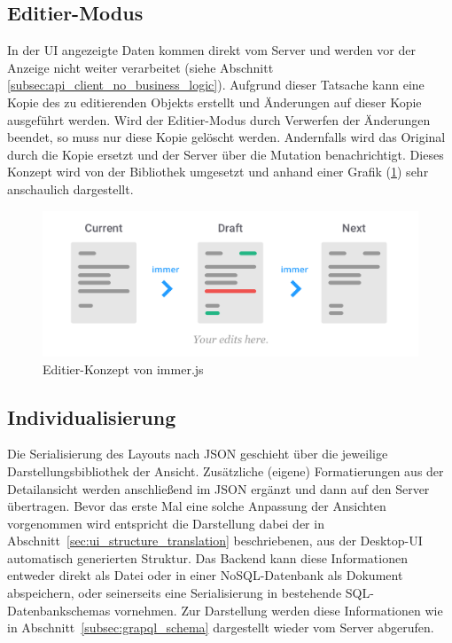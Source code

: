 \subsection{Editier-Modus}
In der UI angezeigte Daten kommen direkt vom Server und werden vor der Anzeige nicht weiter verarbeitet (siehe Abschnitt \ref{subsec:api_client_no_business_logic}). Aufgrund dieser Tatsache kann eine Kopie des zu editierenden Objekts erstellt und Änderungen auf dieser Kopie ausgeführt werden. Wird der Editier-Modus durch Verwerfen der Änderungen beendet, so muss nur diese Kopie gelöscht werden. Andernfalls wird das Original durch die Kopie ersetzt und der Server über die Mutation benachrichtigt. Dieses Konzept wird von der Bibliothek  \parencite{weststrate_2019} umgesetzt und anhand einer Grafik (\ref{fig:immer_draft_concept}) sehr anschaulich dargestellt.

\begin{figure}
    \centering
    \captionsetup{justification=centering}
    \includegraphics[width=\textwidth]{figures/immer_draft_concept.png}
        \caption{Editier-Konzept von immer.js \parencite{weststrate_2019}}\label{fig:immer_draft_concept}
\end{figure}

\subsection{Individualisierung}
Die Serialisierung des Layouts nach JSON geschieht über die jeweilige Darstellungsbibliothek der Ansicht. Zusätzliche (eigene) Formatierungen aus der Detailansicht werden anschließend im JSON ergänzt und dann auf den Server übertragen. Bevor das erste Mal eine solche Anpassung der Ansichten vorgenommen wird entspricht die Darstellung dabei der in Abschnitt~\ref{sec:ui_structure_translation} beschriebenen, aus der Desktop-UI automatisch generierten Struktur. Das Backend kann diese Informationen entweder direkt als Datei oder in einer NoSQL-Datenbank als Dokument abspeichern, oder seinerseits eine Serialisierung in bestehende SQL-Datenbankschemas vornehmen. Zur Darstellung werden diese Informationen wie in Abschnitt~\ref{subsec:grapql_schema} dargestellt wieder vom Server abgerufen.

